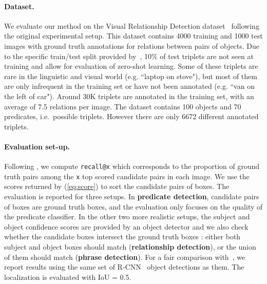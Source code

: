\documentclass[10pt,twocolumn,letterpaper]{article}
\newcommand{\spaceparagraph}{\vspace{-.35cm}}
\begin{document}
\paragraph{Dataset.} 
We evaluate our method on the Visual Relationship Detection dataset~\cite{Lu16} following the original experimental setup. This dataset contains 4000 training and 1000 test images with ground truth annotations for relations between pairs of objects. Due to the specific train/test split provided by~\cite{Lu16}, 10\% of test triplets are not seen at training and allow for evaluation of zero-shot learning. Some of these triplets are rare in the linguistic and visual world (e.g. ``laptop on stove"), but most of them are only infrequent in the training set or have not been annotated (e.g. ``van on the left of car"). Around 30K triplets are annotated in the training set, with an average of 7.5 relations per image. The dataset contains 100 objects and 70 predicates, i.e.\  possible triplets. However there are only 6672 different annotated triplets. 

\spaceparagraph
\paragraph{Evaluation set-up.} Following \cite{Lu16}, we compute
\verb+recall@x+ which corresponds to the proportion of ground truth
pairs among the \verb+x+ top scored candidate pairs in each image. We use
the scores returned by (\ref{eq:score}) to sort the candidate pairs of
boxes. The evaluation is reported for three setups. In
\textbf{predicate detection}, candidate pairs of boxes are ground
truth boxes, and the evaluation only focuses on the quality of the
predicate classifier. In the other two more realistic setups, the
subject and object confidence scores are provided by an object
detector and we also check whether the candidate boxes intersect the
ground truth boxes : either both subject and object boxes should match
(\textbf{relationship detection}), or the union of them should match
(\textbf{phrase detection}). For a fair comparison with~\cite{Lu16},
we report results using the same set of R-CNN~\cite{girshick2014rcnn}
object detections as them. The localization is evaluated with IoU = 0.5. 


\spaceparagraph
\end{document}
